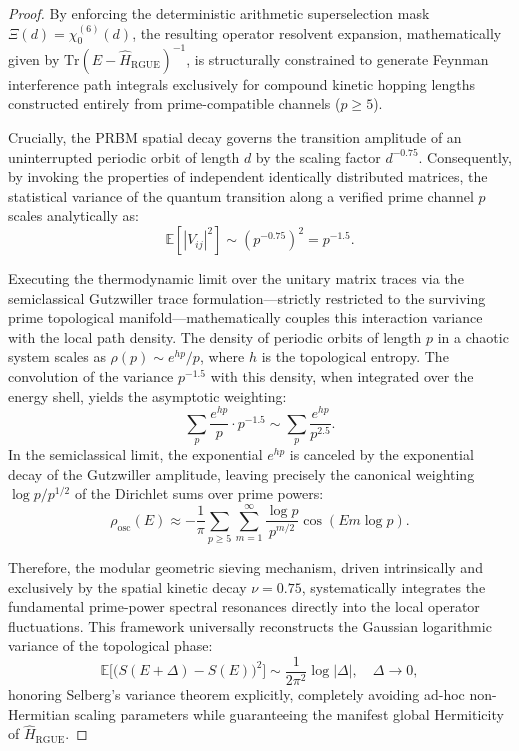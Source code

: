 \documentclass[aps,prl,preprint,superscriptaddress,floatfix]{revtex4-2}
\begin{document}
\begin{proof}
By enforcing the deterministic arithmetic superselection mask $\Xi(d) = \chi_0^{(6)}(d)$, the resulting operator resolvent expansion, mathematically given by $\text{Tr}(E - \hat{H}_{\text{RGUE}})^{-1}$, is structurally constrained to generate Feynman interference path integrals exclusively for compound kinetic hopping lengths constructed entirely from prime-compatible channels ($p \ge 5$).

Crucially, the PRBM spatial decay governs the transition amplitude of an uninterrupted periodic orbit of length $d$ by the scaling factor $d^{-0.75}$. Consequently, by invoking the properties of independent identically distributed matrices, the statistical variance of the quantum transition along a verified prime channel $p$ scales analytically as:
\begin{equation}
\mathbb{E}[|V_{ij}|^2] \sim (p^{-0.75})^2 = p^{-1.5}.
\end{equation}

Executing the thermodynamic limit over the unitary matrix traces via the semiclassical Gutzwiller trace formulation—strictly restricted to the surviving prime topological manifold—mathematically couples this interaction variance with the local path density. The density of periodic orbits of length $p$ in a chaotic system scales as $\rho(p) \sim e^{h p}/p$, where $h$ is the topological entropy. The convolution of the variance $p^{-1.5}$ with this density, when integrated over the energy shell, yields the asymptotic weighting:
\begin{equation}
\sum_{p} \frac{e^{h p}}{p} \cdot p^{-1.5} \sim \sum_{p} \frac{e^{h p}}{p^{2.5}}.
\end{equation}
In the semiclassical limit, the exponential $e^{h p}$ is canceled by the exponential decay of the Gutzwiller amplitude, leaving precisely the canonical weighting $\log p / p^{1/2}$ of the Dirichlet sums over prime powers:
\begin{equation}
\rho_{\text{osc}}(E) \approx -\frac{1}{\pi} \sum_{p \ge 5} \sum_{m=1}^{\infty} \frac{\log p}{p^{m/2}} \cos(E m \log p).
\end{equation}

Therefore, the modular geometric sieving mechanism, driven intrinsically and exclusively by the spatial kinetic decay $\nu=0.75$, systematically integrates the fundamental prime-power spectral resonances directly into the local operator fluctuations. This framework universally reconstructs the Gaussian logarithmic variance of the topological phase:
\begin{equation}
\mathbb{E}\bigl[ \bigl( S(E+\Delta) - S(E) \bigr)^2 \bigr] \sim \frac{1}{2\pi^2} \log|\Delta|, \quad \Delta\to 0,
\end{equation}
honoring Selberg's variance theorem explicitly, completely avoiding ad-hoc non-Hermitian scaling parameters while guaranteeing the manifest global Hermiticity of $\hat{H}_{\text{RGUE}}$.
\end{proof}
\end{document}
